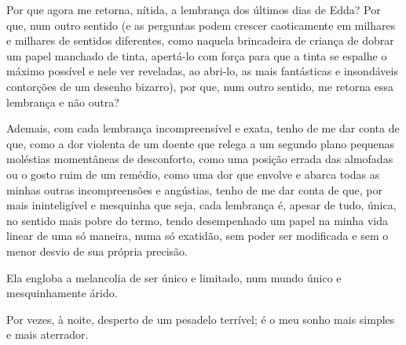 
Por que agora me retorna, nítida, a lembrança dos últimos dias de Edda? Por
que, num outro sentido (e as perguntas podem crescer caoticamente em milhares
e milhares de sentidos diferentes, como naquela brincadeira de criança de
dobrar um papel manchado de tinta, apertá-lo com força para que a tinta se
espalhe o máximo possível e nele ver reveladas, ao abri-lo, as mais
fantásticas e insondáveis contorções de um desenho bizarro), por que, num
outro sentido, me retorna essa lembrança e não outra?

Ademais, com cada lembrança incompreensível e exata, tenho de me dar conta de
que, como a dor violenta de um doente que relega a um segundo plano pequenas
moléstias momentâneas de desconforto, como uma posição errada das almofadas
ou o gosto ruim de um remédio, como uma dor que envolve e abarca todas as
minhas outras incompreensões e angústias, tenho de me dar conta de que, por
mais ininteligível e mesquinha que seja, cada lembrança é, apesar de tudo,
única, no sentido mais pobre do termo, tendo desempenhado um papel na minha
vida linear de uma só maneira, numa só exatidão, sem poder ser modificada e
sem o menor desvio de sua própria precisão.


Ela engloba a melancolia de ser único e limitado, num mundo único e
mesquinhamente árido.

Por vezes, à noite, desperto de um pesadelo terrível; é o meu sonho mais
simples e mais aterrador.


